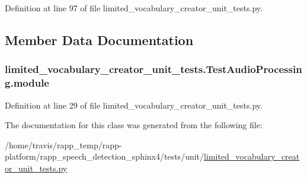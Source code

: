 Definition at line 97 of file limited\-\_\-vocabulary\-\_\-creator\-\_\-unit\-\_\-tests.\-py.



\subsection{Member Data Documentation}
\hypertarget{classlimited__vocabulary__creator__unit__tests_1_1TestAudioProcessing_a3a245e4b4de98cee967b701ada399354}{
\subsubsection[{module}]{\setlength{\rightskip}{0pt plus 5cm}limited\-\_\-vocabulary\-\_\-creator\-\_\-unit\-\_\-tests.\-Test\-Audio\-Processing.\-module}}\label{classlimited__vocabulary__creator__unit__tests_1_1TestAudioProcessing_a3a245e4b4de98cee967b701ada399354}


Definition at line 29 of file limited\-\_\-vocabulary\-\_\-creator\-\_\-unit\-\_\-tests.\-py.



The documentation for this class was generated from the following file\-:\begin{DoxyCompactItemize}
\item 
/home/travis/rapp\-\_\-temp/rapp-\/platform/rapp\-\_\-speech\-\_\-detection\-\_\-sphinx4/tests/unit/\hyperlink{limited__vocabulary__creator__unit__tests_8py}{limited\-\_\-vocabulary\-\_\-creator\-\_\-unit\-\_\-tests.\-py}\end{DoxyCompactItemize}
